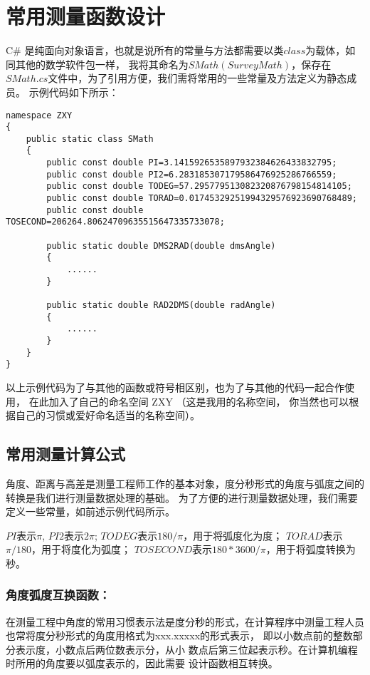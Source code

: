 
\chapter{常用测量函数设计}

C\# 是纯面向对象语言，也就是说所有的常量与方法都需要以类$class$为载体，如同其他的数学软件包一样，
我将其命名为$SMath(SurveyMath)$，保存在$SMath.cs$文件中，为了引用方便，我们需将常用的一些常量及方法定义为静态成员。
示例代码如下所示：
\begin{verbatim}
namespace ZXY
{
    public static class SMath
    {
        public const double PI=3.1415926535897932384626433832795;
        public const double PI2=6.283185307179586476925286766559;
        public const double TODEG=57.295779513082320876798154814105;
        public const double TORAD=0.01745329251994329576923690768489;
        public const double TOSECOND=206264.80624709635515647335733078;
    
        public static double DMS2RAD(double dmsAngle)
        {
            ......
        }
    
        public static double RAD2DMS(double radAngle)
        {
            ......
        }
    }
}
\end{verbatim}

以上示例代码为了与其他的函数或符号相区别，也为了与其他的代码一起合作使用，
在此加入了自己的命名空间 ZXY （这是我用的名称空间，
你当然也可以根据自己的习惯或爱好命名适当的名称空间）。

\section{常用测量计算公式}
角度、距离与高差是测量工程师工作的基本对象，度分秒形式的角度与弧度之间的转换是我们进行测量数据处理的基础。
为了方便的进行测量数据处理，我们需要定义一些常量，如前述示例代码所示。

$PI$表示$\pi$, $PI2$表示$2\pi$;
$TODEG$表示$180/\pi$，用于将弧度化为度；
$TORAD$表示$\pi/180$，用于将度化为弧度；
$TOSECOND$表示$180*3600/\pi$，用于将弧度转换为秒。

\subsection{角度弧度互换函数：}

 在测量工程中角度的常用习惯表示法是度分秒的形式，在计算程序中测量工程人员也常将度分秒形式的角度用格式为xxx.xxxxx的形式表示，
 即以小数点前的整数部分表示度，小数点后两位数表示分，从小
 数点后第三位起表示秒。在计算机编程时所用的角度要以弧度表示的，因此需要
 设计函数相互转换。

